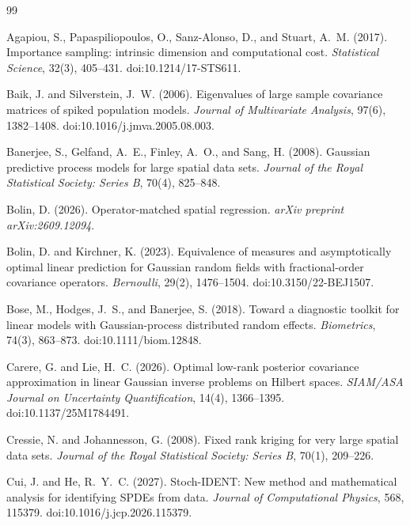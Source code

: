 \documentclass[11pt]{article}
\numberwithin{table}{section}
\numberwithin{figure}{section}
\begin{document}
{\small
\begin{thebibliography}{99}

Agapiou, S., Papaspiliopoulos, O., Sanz-Alonso, D., and Stuart, A.~M. (2017).
Importance sampling: intrinsic dimension and computational cost.
\emph{Statistical Science}, 32(3), 405--431.
doi:10.1214/17-STS611.

Baik, J. and Silverstein, J.~W. (2006).
Eigenvalues of large sample covariance matrices of spiked population models.
\emph{Journal of Multivariate Analysis}, 97(6), 1382--1408.
doi:10.1016/j.jmva.2005.08.003.

Banerjee, S., Gelfand, A.~E., Finley, A.~O., and Sang, H. (2008).
Gaussian predictive process models for large spatial data sets.
\emph{Journal of the Royal Statistical Society: Series B}, 70(4), 825--848.

Bolin, D. (2026).
Operator-matched spatial regression.
\emph{arXiv preprint arXiv:2609.12094}.

Bolin, D. and Kirchner, K. (2023).
Equivalence of measures and asymptotically optimal linear prediction for Gaussian random fields with fractional-order covariance operators.
\emph{Bernoulli}, 29(2), 1476--1504.
doi:10.3150/22-BEJ1507.

Bose, M., Hodges, J.~S., and Banerjee, S. (2018).
Toward a diagnostic toolkit for linear models with Gaussian-process distributed random effects.
\emph{Biometrics}, 74(3), 863--873.
doi:10.1111/biom.12848.

Carere, G. and Lie, H.~C. (2026).
Optimal low-rank posterior covariance approximation in linear Gaussian inverse problems on Hilbert spaces.
\emph{SIAM/ASA Journal on Uncertainty Quantification}, 14(4), 1366--1395.
doi:10.1137/25M1784491.

Cressie, N. and Johannesson, G. (2008).
Fixed rank kriging for very large spatial data sets.
\emph{Journal of the Royal Statistical Society: Series B}, 70(1), 209--226.

Cui, J. and He, R.~Y.~C. (2027).
Stoch-IDENT: New method and mathematical analysis for identifying SPDEs from data.
\emph{Journal of Computational Physics}, 568, 115379.
doi:10.1016/j.jcp.2026.115379.


\end{thebibliography}}
\end{document}
